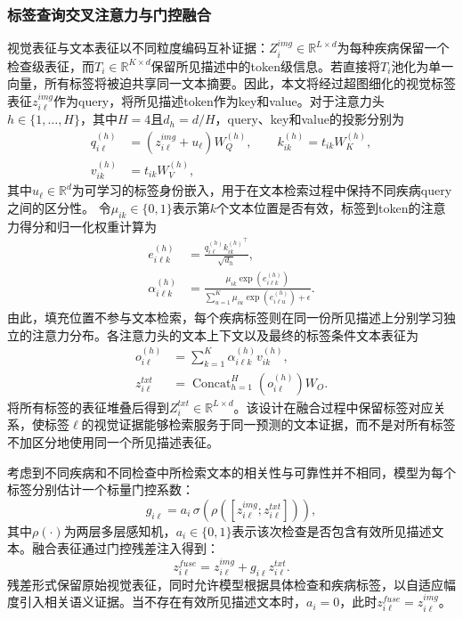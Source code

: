 \documentclass[Afour,sagev,times]{sagej}
\begin{document}
\subsubsection{标签查询交叉注意力与门控融合}

视觉表征与文本表征以不同粒度编码互补证据：$Z_i^{img}\in\mathbb{R}^{L\times d}$为每种疾病保留一个检查级表征，而$T_i\in\mathbb{R}^{K\times d}$保留所见描述中的token级信息。若直接将$T_i$池化为单一向量，所有标签将被迫共享同一文本摘要。因此，本文将经过超图细化的视觉标签表征$z_{i\ell}^{img}$作为query，将所见描述token作为key和value。对于注意力头$h\in\{1,\ldots,H\}$，其中$H=4$且$d_h=d/H$，query、key和value的投影分别为
\begin{equation}
\begin{aligned}
q_{i\ell}^{(h)}&=(z_{i\ell}^{img}+u_{\ell})W_Q^{(h)},\qquad
k_{ik}^{(h)}=t_{ik}W_K^{(h)},\\
v_{ik}^{(h)}&=t_{ik}W_V^{(h)},
\end{aligned}
\end{equation}
其中$u_{\ell}\in\mathbb{R}^{d}$为可学习的标签身份嵌入，用于在文本检索过程中保持不同疾病query之间的区分性。
令$\mu_{ik}\in\{0,1\}$表示第$k$个文本位置是否有效，标签到token的注意力得分和归一化权重计算为
\begin{equation}
\begin{aligned}
e_{i\ell k}^{(h)}&=\frac{q_{i\ell}^{(h)}{k_{ik}^{(h)}}^{\top}}{\sqrt{d_h}},\\
\alpha_{i\ell k}^{(h)}&=
\frac{\mu_{ik}\exp(e_{i\ell k}^{(h)})}
{\sum_{u=1}^{K}\mu_{iu}\exp(e_{i\ell u}^{(h)})+\epsilon}.
\end{aligned}
\end{equation}
由此，填充位置不参与文本检索，每个疾病标签则在同一份所见描述上分别学习独立的注意力分布。各注意力头的文本上下文以及最终的标签条件文本表征为
\begin{equation}
\begin{aligned}
o_{i\ell}^{(h)}&=\sum_{k=1}^{K}\alpha_{i\ell k}^{(h)}v_{ik}^{(h)},\\
z_{i\ell}^{txt}&=\operatorname{Concat}_{h=1}^{H}\!\left(o_{i\ell}^{(h)}\right)W_O.
\end{aligned}
\end{equation}
将所有标签的表征堆叠后得到$Z_i^{txt}\in\mathbb{R}^{L\times d}$。该设计在融合过程中保留标签对应关系，使标签$\ell$的视觉证据能够检索服务于同一预测的文本证据，而不是对所有标签不加区分地使用同一个所见描述表征。

考虑到不同疾病和不同检查中所检索文本的相关性与可靠性并不相同，模型为每个标签分别估计一个标量门控系数：
\begin{equation}
g_{i\ell}=a_i\,\sigma\!\left(\rho([z_{i\ell}^{img};z_{i\ell}^{txt}])\right),
\end{equation}
其中$\rho(\cdot)$为两层多层感知机，$a_i\in\{0,1\}$表示该次检查是否包含有效所见描述文本。融合表征通过门控残差注入得到：
\begin{equation}
z_{i\ell}^{fuse}=z_{i\ell}^{img}+g_{i\ell}z_{i\ell}^{txt}.
\end{equation}
残差形式保留原始视觉表征，同时允许模型根据具体检查和疾病标签，以自适应幅度引入相关语义证据。当不存在有效所见描述文本时，$a_i=0$，此时$z_{i\ell}^{fuse}=z_{i\ell}^{img}$。
\end{document}
